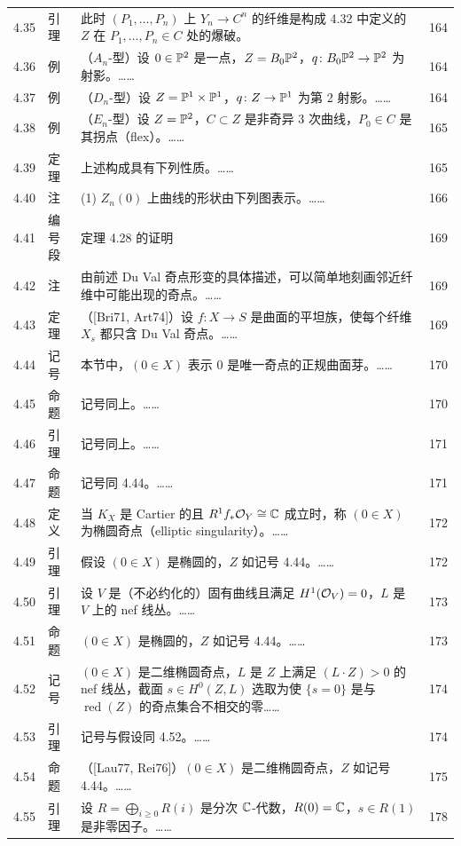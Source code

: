 \begin{longtable}{@{}p{}p{}p{}p{}@{}}
4.35 & 引理 & 此时 $(P_1,\dots,P_n)$ 上 $Y_n\to C^n$ 的纤维是构成 4.32 中定义的 $Z$ 在 $P_1,\dots,P_n\in C$ 处的爆破。 & 164 \\
4.36 & 例 & （$A_n$-型）设 $0\in\mathbb{P}^2$ 是一点，$Z=B_0\mathbb{P}^2$，$q\colon B_0\mathbb{P}^2\to\mathbb{P}^2$ 为射影。…… & 164 \\
4.37 & 例 & （$D_n$-型）设 $Z=\mathbb{P}^1\times\mathbb{P}^1$，$q\colon Z\to\mathbb{P}^1$ 为第 2 射影。…… & 164 \\
4.38 & 例 & （$E_n$-型）设 $Z=\mathbb{P}^2$，$C\subset Z$ 是非奇异 3 次曲线，$P_0\in C$ 是其拐点（flex）。…… & 165 \\
4.39 & 定理 & 上述构成具有下列性质。…… & 165 \\
4.40 & 注 & (1) $Z_n(0)$ 上曲线的形状由下列图表示。…… & 166 \\
4.41 & 编号段 & 定理 4.28 的证明 & 169 \\
4.42 & 注 & 由前述 Du Val 奇点形变的具体描述，可以简单地刻画邻近纤维中可能出现的奇点。…… & 169 \\
4.43 & 定理 & （[Bri71, Art74]）设 $f\colon X\to S$ 是曲面的平坦族，使每个纤维 $X_s$ 都只含 Du Val 奇点。…… & 169 \\
4.44 & 记号 & 本节中，$(0\in X)$ 表示 $0$ 是唯一奇点的正规曲面芽。…… & 170 \\
4.45 & 命题 & 记号同上。…… & 170 \\
4.46 & 引理 & 记号同上。…… & 171 \\
4.47 & 命题 & 记号同 4.44。…… & 171 \\
4.48 & 定义 & 当 $K_X$ 是 Cartier 的且 $R^1f_*\mathcal{O}_Y\cong\mathbb{C}$ 成立时，称 $(0\in X)$ 为椭圆奇点（elliptic singularity）。…… & 172 \\
4.49 & 引理 & 假设 $(0\in X)$ 是椭圆的，$Z$ 如记号 4.44。…… & 172 \\
4.50 & 引理 & 设 $V$ 是（不必约化的）固有曲线且满足 $H^1(\mathcal{O}_V)=0$，$L$ 是 $V$ 上的 nef 线丛。…… & 173 \\
4.51 & 命题 & $(0\in X)$ 是椭圆的，$Z$ 如记号 4.44。…… & 173 \\
4.52 & 记号 & $(0\in X)$ 是二维椭圆奇点，$L$ 是 $Z$ 上满足 $(L\cdot Z)>0$ 的 nef 线丛，截面 $s\in H^0(Z,L)$ 选取为使 $\{s=0\}$ 是与 $\operatorname{red}(Z)$ 的奇点集合不相交的零…… & 174 \\
4.53 & 引理 & 记号与假设同 4.52。…… & 174 \\
4.54 & 命题 & （[Lau77, Rei76]）$(0\in X)$ 是二维椭圆奇点，$Z$ 如记号 4.44。…… & 175 \\
4.55 & 引理 & 设 $R=\bigoplus_{i\ge 0}R(i)$ 是分次 $\mathbb{C}$-代数，$R(0)=\mathbb{C}$，$s\in R(1)$ 是非零因子。…… & 178 \\

\end{longtable}
